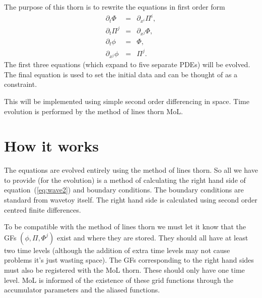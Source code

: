 The purpose of this thorn is to rewrite the equations in first order
form
\begin{eqnarray}
  \label{eq:wave2}
  \partial_t \Phi & = & \partial_{x^i} \Pi^i, \\
  \partial_t \Pi^j & = & \partial_{x^j} \Phi, \\
  \partial_t \phi & = & \Phi, \\
  \partial_{x^j} \phi & = & \Pi^j.
\end{eqnarray}
The first three equations (which expand to five separate PDEs) will be
evolved. The final equation is used to set the initial data and can be
thought of as a constraint.

This will be implemented using simple second order differencing in
space. Time evolution is performed by the method of lines thorn MoL.

\section{How it works}
\label{sec:details}

The equations are evolved entirely using the method of lines thorn. So
all we have to provide (for the evolution) is a method of calculating
the right hand side of equation~(\ref{eq:wave2}) and boundary
conditions. The boundary conditions are standard from wavetoy
itself. The right hand side is calculated using second order centred
finite differences.

To be compatible with the method of lines thorn we must let it know
that the GFs $(\phi, \Pi, \Phi^j)$ exist and where they are stored.
They should all have at least two time levels (although the addition
of extra time levels may not cause problems it's just wasting space).
The GFs corresponding to the right hand sides must also be registered
with the MoL thorn. These should only have one time level. MoL is
informed of the existence of these grid functions through the
accumulator parameters and the aliased functions.



